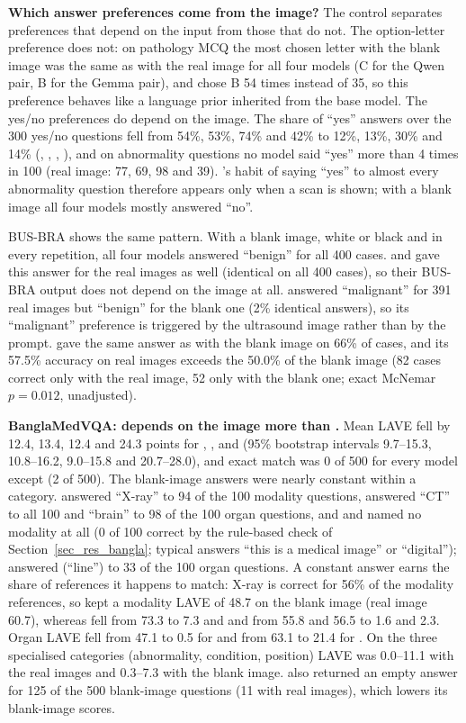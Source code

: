 {\color{blue}
\textbf{Which answer preferences come from the image?} The control separates preferences that depend on the input from those that do not. The option-letter preference does not: on pathology MCQ the most chosen letter with the blank image was the same as with the real image for all four models (C for the Qwen pair, B for the Gemma pair), and \gemma{} chose B 54 times instead of 35, so this preference behaves like a language prior inherited from the base model. The yes/no preferences do depend on the image. The share of ``yes'' answers over the 300 yes/no questions fell from 54\%, 53\%, 74\% and 42\% to 12\%, 13\%, 30\% and 14\% (\qwen{}, \medvlm{}, \gemma{}, \medgemma{}), and on abnormality questions no model said ``yes'' more than 4 times in 100 (real image: 77, 69, 98 and 39). \gemma{}'s habit of saying ``yes'' to almost every abnormality question therefore appears only when a scan is shown; with a blank image all four models mostly answered ``no''.

BUS-BRA shows the same pattern. With a blank image, white or black and in every repetition, all four models answered ``benign'' for all 400 cases. \qwen{} and \medvlm{} gave this answer for the real images as well (identical on all 400 cases), so their BUS-BRA output does not depend on the image at all. \gemma{} answered ``malignant'' for 391 real images but ``benign'' for the blank one (2\% identical answers), so its ``malignant'' preference is triggered by the ultrasound image rather than by the prompt. \medgemma{} gave the same answer as with the blank image on 66\% of cases, and its 57.5\% accuracy on real images exceeds the 50.0\% of the blank image (82 cases correct only with the real image, 52 only with the blank one; exact McNemar $p=0.012$, unadjusted).

\textbf{BanglaMedVQA: \medgemma{} depends on the image more than \gemma{}.} Mean LAVE fell by 12.4, 13.4, 12.4 and 24.3 points for \qwen{}, \medvlm{}, \gemma{} and \medgemma{} (95\% bootstrap intervals 9.7--15.3, 10.8--16.2, 9.0--15.8 and 20.7--28.0), and exact match was 0 of 500 for every model except \gemma{} (2 of 500). The blank-image answers were nearly constant within a category. \gemma{} answered ``X-ray'' to 94 of the 100 modality questions, \medgemma{} answered ``CT'' to all 100 and ``brain'' to 98 of the 100 organ questions, and \qwen{} and \medvlm{} named no modality at all (0 of 100 correct by the rule-based check of Section~\ref{sec_res_bangla}; typical answers ``this is a medical image'' or ``digital''); \qwen{} answered  (``line'') to 33 of the 100 organ questions. A constant answer earns the share of references it happens to match: X-ray is correct for 56\% of the modality references, so \gemma{} kept a modality LAVE of 48.7 on the blank image (real image 60.7), whereas \medgemma{} fell from 73.3 to 7.3 and \qwen{} and \medvlm{} from 55.8 and 56.5 to 1.6 and 2.3. Organ LAVE fell from 47.1 to 0.5 for \gemma{} and from 63.1 to 21.4 for \medgemma{}. On the three specialised categories (abnormality, condition, position) LAVE was 0.0--11.1 with the real images and 0.3--7.3 with the blank image. \gemma{} also returned an empty answer for 125 of the 500 blank-image questions (11 with real images), which lowers its blank-image scores.

}
